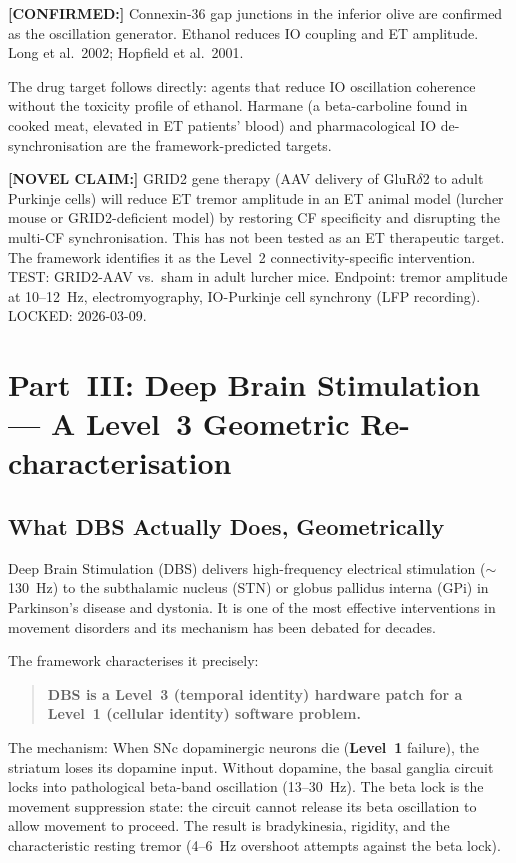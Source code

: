 \documentclass[12pt,a4paper]{article}
\newcommand{\novel}[1]{\noindent\colorbox{yellow!18}{\parbox{\dimexpr\linewidth-2\fboxsep}{%
  \textbf{[NOVEL CLAIM:]} #1}}\vspace{0.4em}}
\newcommand{\confirmed}[1]{\noindent\colorbox{green!10}{\parbox{\dimexpr\linewidth-2\fboxsep}{%
  \textbf{[CONFIRMED:]} #1}}\vspace{0.4em}}
\newcommand{\Lev}[1]{\textbf{Level~#1}}
\begin{document}
\confirmed{Connexin-36 gap junctions in the inferior olive are confirmed
as the oscillation generator. Ethanol reduces IO coupling and ET amplitude.
Long et al.\ 2002; Hopfield et al.\ 2001.}

The drug target follows directly: agents that reduce IO oscillation coherence
without the toxicity profile of ethanol. Harmane (a beta-carboline found in
cooked meat, elevated in ET patients' blood) and pharmacological IO
de-synchronisation are the framework-predicted targets.

\novel{GRID2 gene therapy (AAV delivery of GluR$\delta$2 to adult
Purkinje cells) will reduce ET tremor amplitude in an ET animal model
(lurcher mouse or GRID2-deficient model) by restoring CF specificity
and disrupting the multi-CF synchronisation. This has not been tested
as an ET therapeutic target. The framework identifies it as the Level~2
connectivity-specific intervention. TEST: GRID2-AAV vs.\ sham in adult
lurcher mice. Endpoint: tremor amplitude at 10--12~Hz, electromyography,
IO-Purkinje cell synchrony (LFP recording). LOCKED: 2026-03-09.}

\section{Part~III: Deep Brain Stimulation --- A Level~3 Geometric
Re-characterisation}

\subsection{What DBS Actually Does, Geometrically}

Deep Brain Stimulation (DBS) delivers high-frequency electrical stimulation
($\sim$130~Hz) to the subthalamic nucleus (STN) or globus pallidus interna
(GPi) in Parkinson's disease and dystonia. It is one of the most effective
interventions in movement disorders and its mechanism has been debated for
decades.

The framework characterises it precisely:

\begin{quote}
\textbf{DBS is a \Lev{3} (temporal identity) hardware patch for a \Lev{1}
(cellular identity) software problem.}
\end{quote}

The mechanism: When SNc dopaminergic neurons die (\Lev{1} failure), the
striatum loses its dopamine input. Without dopamine, the basal ganglia circuit
locks into pathological beta-band oscillation (13--30~Hz). The beta lock is
the movement suppression state: the circuit cannot release its beta oscillation
to allow movement to proceed. The result is bradykinesia, rigidity, and
the characteristic resting tremor (4--6~Hz overshoot attempts against the
beta lock).
\end{document}
